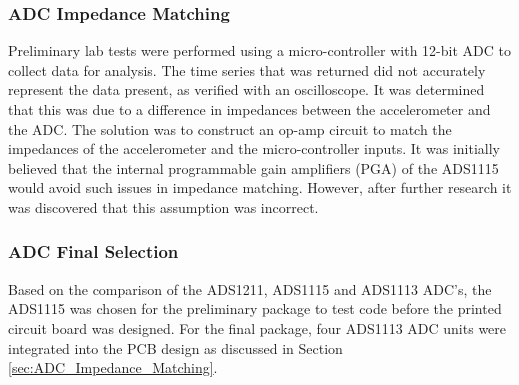 \subsubsection{ADC Impedance Matching}
\label{sec:ADC_Impedance_Issues}
Preliminary lab tests were performed using a micro-controller with 12-bit ADC to collect data for analysis.
The time series that was returned did not accurately represent the data present, as verified with an oscilloscope.
It was determined that this was due to a difference in impedances between the accelerometer and the ADC.
The solution was to construct an op-amp circuit to match the impedances of the accelerometer and the micro-controller inputs.
It was initially believed that the internal programmable gain amplifiers (PGA) of the ADS1115 would avoid such issues in impedance matching.
However, after further research it was discovered that this assumption was incorrect.


\subsubsection{ADC Final Selection}
\indent Based on the comparison of the ADS1211, ADS1115 and ADS1113 ADC's, the ADS1115 was chosen for the preliminary package to test code before the printed circuit board was designed.
For the final package, four ADS1113 ADC units were integrated into the PCB design as discussed in Section \ref{sec:ADC_Impedance_Matching}. 
